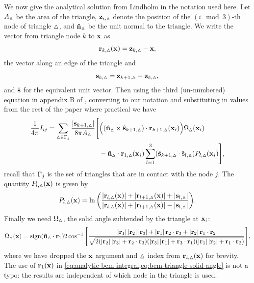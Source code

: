 We now give the analytical solution from Lindholm in the notation used here.
Let $A_\vartriangle$ be the area of the triangle, $\boldsymbol{\mathrm{z}}_{i,\vartriangle}$ denote the position of the $(i \mod 3)$-th node of triangle $\vartriangle$, and $\boldsymbol{\mathrm{\hat{n}}}_\vartriangle$ be the unit normal to the triangle.
We write the vector from triangle node $k$ to $\boldsymbol{\mathrm{x}}$ as
\begin{equation}
  \boldsymbol{\mathrm{r}}_{k,\vartriangle}(\boldsymbol{\mathrm{x}}) = \boldsymbol{\mathrm{z}}_{k,\vartriangle} - \boldsymbol{\mathrm{x}},
\end{equation}
the vector along an edge of the triangle and
\begin{equation}
  {\boldsymbol{\mathrm{s}}}_{k,\vartriangle} = \boldsymbol{\mathrm{z}}_{k+1,\vartriangle} - \boldsymbol{\mathrm{z}}_{k,\vartriangle},
\end{equation}
and ${\hat{\mathbf{s}}}$ for the equivalent unit vector.
Then using the third (un-numbered) equation in appendix B of \cite{Lindholm1984}, converting to our notation and substituting in values from the rest of the paper where practical we have
\begin{equation}
  \begin{aligned}
    \label{eq:analytic-bem-integral}
    \frac{1}{4\pi}\bmint = \sum_{\tri \in \boundd_j} \frac{\abs{\sv_{k+1,\tri} }}{8 \pi A_\tri}
    \Bigg[&
      \Big( (\nv_\tri \times \svu_{k+1,\tri}) \cdot \rv_{k+1,\tri}(\xv_i)\Big) \Omega_\tri(\xv_i) \\
      &- \nv_\tri \cdot \rv_{1,\tri}(\xv_i) \sum_{l=1}^{3}
      (\svu_{k+1,\tri} \cdot \svu_{l,\tri}) P_{l,\tri}(\xv_i)
    \Bigg],
  \end{aligned}
\end{equation}
recall that ${\Gamma}_j$ is the set of triangles that are in contact with the node $j$.
The quantity $P_{l,\vartriangle}(\boldsymbol{\mathrm{x}})$ is given by
\begin{equation}
  P_{l,\vartriangle}(\boldsymbol{\mathrm{x}}) = \ln{\left( \frac{\left|{\boldsymbol{\mathrm{r}}_{l,\vartriangle}(\boldsymbol{\mathrm{x}})} \right| + \left|{\boldsymbol{\mathrm{r}}_{l+1,\vartriangle}(\boldsymbol{\mathrm{x}})} \right| + \left|{{\boldsymbol{\mathrm{s}}}_{l,\vartriangle}} \right|}
    {\left|{\boldsymbol{\mathrm{r}}_{l,\vartriangle}(\boldsymbol{\mathrm{x}})} \right| + \left|{\boldsymbol{\mathrm{r}}_{l+1,\vartriangle}(\boldsymbol{\mathrm{x}})} \right| - \left|{{\boldsymbol{\mathrm{s}}}_{l,\vartriangle}} \right|} \right)}.
\end{equation}
Finally we need $\Omega_\vartriangle$, the solid angle subtended by the triangle at $\boldsymbol{\mathrm{x}}_i$:
\begin{equation}
  \label{eq:bem-triangle-solid-angle}
  \Omega_\tri(\xv) = \text{sign}(\nv_\tri \cdot \rv_1) 2 \cos^{-1}\bigs{\frac
    {\abs{\rv_1}\abs{\rv_2}\abs{\rv_3} + \abs{\rv_1} \rv_2\cdot\rv_3 + \abs{\rv_2}\rv_1\cdot \rv_2}
    {\sqrt{2(\abs{\rv_2}\abs{\rv_3} + \rv_2\cdot\rv_3)
        (\abs{\rv_3}\abs{\rv_1} + \rv_3\cdot\rv_1)
        (\abs{\rv_1}\abs{\rv_2} + \rv_1\cdot\rv_2)}}},
\end{equation}
where we have dropped the $\boldsymbol{\mathrm{x}}$ argument and $\vartriangle$ index from $\boldsymbol{\mathrm{r}}_{i,\vartriangle}(\boldsymbol{\mathrm{x}})$ for brevity.
The use of $\boldsymbol{\mathrm{r}}_1(\boldsymbol{\mathrm{x}})$ in \cref{eq:analytic-bem-integral,eq:bem-triangle-solid-angle} is not a typo: the results are independent of which node in the triangle is used.


